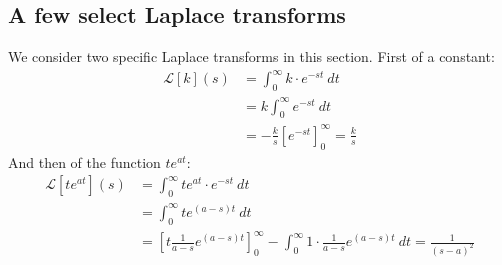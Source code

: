 \documentclass[12pt, a4paper]{article}
\numberwithin{equation}{section}
\begin{document}
\subsection{A few select Laplace transforms}
We consider two specific Laplace transforms in this section. First of a constant:
\begin{align}
\mathcal{L}[k](s)&=\int_0^\infty k\cdot e^{-st}\ dt\\
&=k\int_0^\infty e^{-st}\ dt\\
&=-\frac{k}{s}[e^{-st}]_0^\infty=\frac{k}{s}
\end{align}
And then of the function $te^{at}$:
\begin{align}
\mathcal{L}[te^{at}](s)&=\int_0^\infty te^{at}\cdot e^{-st}\ dt\\
&=\int_0^\infty te^{(a-s)t}\ dt\\
&=\left[t\frac{1}{a-s}e^{(a-s)t}\right]_0^\infty-\int_0^\infty 1\cdot\frac{1}{a-s}e^{(a-s)t}\ dt=\frac{1}{(s-a)^2}
\end{align}
\end{document}
